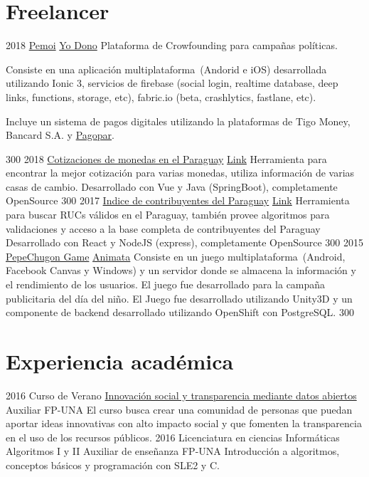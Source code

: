 \documentclass[]{friggeri-cv}
\begin{document}
\section{Freelancer}
\proyectof
    {2018}
    {\href{https://www.pemoi.com.py}{Pemoi}}
    {\href{https://www.pemoi.com.py/}{Yo Dono}}
    {Plataforma de Crowfounding para campañas políticas.}
    {Consiste en una aplicación multiplataforma~(Andorid e iOS) desarrollada utilizando
     Ionic 3, servicios de firebase (social login, realtime database, deep links, functions, 
     storage, etc), fabric.io (beta, crashlytics, fastlane, etc).
     
     Incluye un sistema de pagos digitales utilizando la plataformas de
     Tigo Money, Bancard S.A. y \href{https://www.pagopar.com.py}{Pagopar}.
     
     }
    {300}
\proyectof
    {2018}
    {\href{http://github.com/avolpe/cotizacion}{Cotizaciones de monedas en el Paraguay}}
    {\href{https://cotizaciones.volpe.com.py}{Link}}
    {Herramienta para encontrar la mejor cotización para varias monedas,
    utiliza información de varias casas de cambio.}
    {Desarrollado con Vue y Java (SpringBoot), completamente OpenSource}
    {300}
\proyectof
    {2017}
    {\href{http://github.com/avolpe/set-ruc-finder}{Indice de contribuyentes del Paraguay}}
    {\href{https://set.volpe.com.py}{Link}}
    {Herramienta para buscar RUCs válidos en el Paraguay, también provee algoritmos
    para validaciones y acceso a la base completa de contribuyentes del Paraguay}
    {Desarrollado con React y NodeJS (express), completamente OpenSource}
    {300}
\proyectof
    {2015}
    {\href{https://apps.facebook.com/pechugon_pepe}{PepeChugon Game}}
    {\href{http://www.animata.com.py/}{Animata}}
    {Consiste en un juego multiplataforma~(Android, Facebook Canvas y Windows)
        y un servidor donde se almacena la información y el rendimiento de los
        usuarios. El juego fue desarrollado para la campaña publicitaria del día
        del niño.}
    {El Juego fue desarrollado utilizando Unity3D y un componente de backend 
    desarrollado utilizando OpenShift con PostgreSQL.}
    {300}
        

\section{Experiencia académica}

\clase
    {2016}
    {Curso de Verano}
    {\href{http://www.pol.una.py/cursosverano/index.php?option=com_content&view=article&layout=edit&id=91}{Innovación
            social y transparencia mediante datos abiertos}} 
    {Auxiliar}
    {FP-UNA}
    {El curso busca crear una comunidad de personas que puedan aportar ideas
        innovativas con alto impacto social y que fomenten la transparencia en
        el uso de los recursos públicos. }
\clase
    {2016}
    {Licenciatura en ciencias Informáticas}
    {Algoritmos I y II} 
    {Auxiliar de enseñanza}
    {FP-UNA}
    {Introducción a algoritmos, conceptos básicos y programación con SLE2 y C.}
\end{document}
